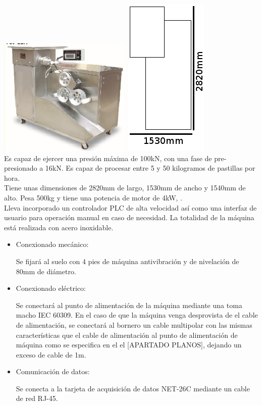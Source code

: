 	\includegraphics[scale=1]{Datasheets/2MaquinaPrensadoFoto.png}\hfill
	\includegraphics[scale=0.8]{Datasheets/Miniaturas/compresion.png}\\

	Es capaz de ejercer una presión máxima de 100kN, con una fase de pre-presionado a 16kN. Es capaz de procesar entre 5 y 50 kilogramos de pastillas por hora. \\

	Tiene unas dimensiones de 2820mm de largo, 1530mm de ancho y 1540mm de alto. Pesa 500kg y tiene una potencia de motor de 4kW, .\\

	Lleva incorporado un controlador PLC de alta velocidad así como una interfaz de usuario para operación manual en caso de necesidad. La totalidad de la máquina está realizada con acero inoxidable. 


		\begin{itemize}
				\item{Conexionado mecánico:}
				
				Se fijará al suelo con 4 pies de máquina antivibración y de nivelación de 80mm de diámetro.

				\item{Conexionado eléctrico:}

				Se conectará al punto de alimentación de la máquina mediante una  toma macho IEC 60309. En el caso de que la máquina venga desprovista de el cable de alimentación, se conectará al bornero un cable multipolar con las mismas características que el cable de alimentación al punto de alimentación de máquina como se especifica en el el [APARTADO PLANOS], dejando un exceso de cable de 1m. \
								
				\item{Comunicación de datos:}

				Se conecta a la tarjeta de acquisición de datos NET-26C mediante un cable de red RJ-45.
		\end{itemize}

